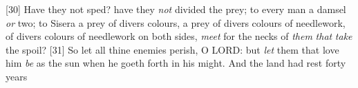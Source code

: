 [30] \textcolor[cmyk]{0.99998,1,0,0}{Have they not sped? have they \emph{not} divided the prey; to every man a damsel \emph{or} two; to Sisera a prey of divers colours, a prey of divers colours of needlework, of divers colours of needlework on both sides, \emph{meet} for the necks of \emph{them} \emph{that} \emph{take} the spoil?}
[31] \textcolor[cmyk]{0.99998,1,0,0}{So let all thine enemies perish, O LORD: but \emph{let} them that love him \emph{be} as the sun when he goeth forth in his might. And the land had rest forty years}